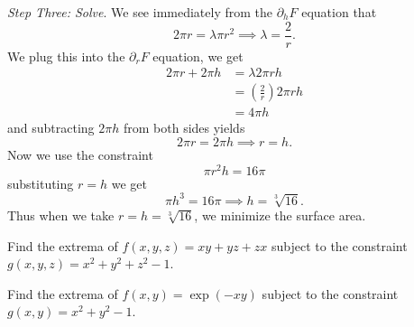 \begin{example}
\emph{Step Three: Solve}. We see immediately from the
$\partial_{h}F$ equation that
\begin{equation}
2\pi r = \lambda \pi r^{2}\implies \lambda=\frac{2}{r}.
\end{equation}
We plug this into the $\partial_{r}F$ equation, we get
\begin{equation}
\begin{aligned}
2\pi r+2\pi h &= \lambda2\pi rh\\
&=\left(\frac{2}{r}\right)2\pi rh\\
&=4\pi h
\end{aligned}
\end{equation}
and subtracting $2\pi h$ from both sides yields
\begin{equation}
2\pi r=2\pi h\implies r=h.
\end{equation}
Now we use the constraint
\begin{equation}
\pi r^{2}h = 16\pi
\end{equation}
substituting $r=h$ we get
\begin{equation}
\pi h^{3} = 16\pi\implies h = \sqrt[3]{16}.
\end{equation}
Thus when we take $r=h=\sqrt[3]{16}$, we minimize the surface area.
\end{example}


\begin{exercise}
Find the extrema of $f(x,y,z)=xy+yz+zx$ subject to the constraint
$g(x,y,z)=x^{2}+y^{2}+z^{2}-1$.
\end{exercise}
\begin{exercise}
Find the extrema of $f(x,y)=\exp(-xy)$ subject to the constraint
$g(x,y)=x^{2}+y^{2}-1$.
\end{exercise}


